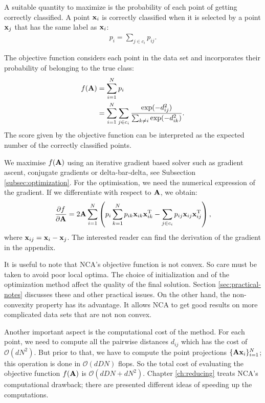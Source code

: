 	A suitable quantity to maximize is the probability of each point of getting correctly classified. A point $\mathbf{x}_i$ is correctly classified when it is selected by a point $\mathbf{x}_j$ that has the same label as $\mathbf{x}_i$:
	\begin{align}
		p_i = \sum_{j\in c_i} p_{ij}.
	\end{align}
	
	The objective function considers each point in the data set and incorporates their probability of belonging to the true class:
	\begin{align}
		f(\mathbf{A}) &= \sum_{i=1}^N p_i\notag\\
			   &= \sum_{i=1}^N \sum_{j\in c_i} \frac{
								\exp(-d_{ij}^2)
							  }{
								\sum_{k\neq i}\exp(-d_{ik}^2)
							  }.
	\label{eq:nca-obj}
	\end{align}
	The score given by the objective function can be interpreted as the expected number of the correctly classified points.
	
	We maximise $f(\mathbf{A})$ using an iterative gradient based solver such as gradient ascent, conjugate gradients or delta-bar-delta, see Subsection \ref{subsec:optimization}. For the optimisation, we need the numerical expression of the gradient. If we differentiate with respect to $\mathbf{A}$, we obtain:
	\begin{align}
	  \frac{\partial f}{\partial
	\mathbf{A}}=2\mathbf{A}\sum_{i=1}^{N}\left(p_i\sum_{k=1}^Np_{ik}\mathbf{x}_{ik}\mathbf{x}_{ik}^{\textrm{T}} -
	\sum_{j\in c_i}p_{ij}\mathbf{x}_{ij}\mathbf{x}_{ij}^{\textrm{T}} \right)\label{eq:nca-grad},
	\end{align}
	where $\mathbf{x}_{ij} = \mathbf{x}_i - \mathbf{x}_j$. The interested reader can find the derivation of the gradient in the appendix. 
	
	It is useful to note that NCA's objective function is not convex. So care must be taken to avoid poor local optima. The choice of initialization and of the optimization method affect the quality of the final solution. Section \ref{sec:practical-notes} discusses these and other practical issues. On the other hand, the non-convexity property has its advantage. It allows NCA to get good results on more complicated data sets that are not non convex. 

	Another important aspect is the computational cost of the method. For each point, we need to compute all the pairwise distances $d_{ij}$ which has the cost of $\mathcal{O}(dN^2)$. But prior to that, we have to compute the point projections $\{\mathbf{A}\mathbf{x}_i\}_{i=1}^N$; this operation is done in $\mathcal{O}(dDN)$ flops. So the total cost of evaluating the objective function $f(\mathbf{A})$ is  $\mathcal{O}(dDN+dN^2)$. Chapter \ref{ch:reducing} treats NCA's computational drawback; there are presented different ideas of speeding up the computations.
	

